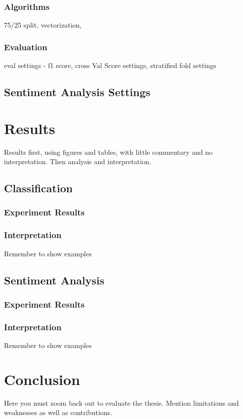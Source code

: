 \documentclass[oneside,12pt]{Classes/RoboticsLaTeX}
\begin{document}
\subsection{Algorithms}
\label{sec:algor}
75/25 split, vectorization,
\subsection{Evaluation}
eval settings - f1 score, cross Val Score settings, stratified fold settings

\section{Sentiment Analysis Settings}


\chapter{Results}
\label{chap:results}
Results first, using figures and tables, with little commentary and no interpretation.
Then analysis and interpretation.

\section{Classification}
\subsection{Experiment Results}
\subsection{Interpretation}
Remember to show examples

\section{Sentiment Analysis}
\subsection{Experiment Results}
\subsection{Interpretation}
Remember to show examples

\chapter{Conclusion}
\label{chap:conclusion}
Here you must zoom back out to evaluate the thesis. Mention limitations and weaknesses as well as contributions.
\end{document}
